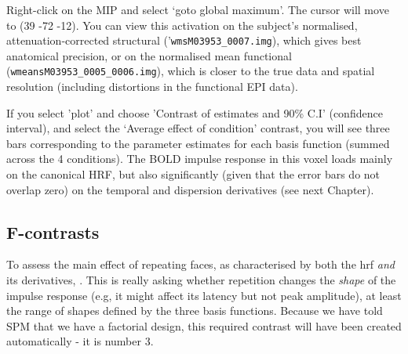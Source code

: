 Right-click on the MIP and select `goto global maximum'. The cursor will move to (39 -72 -12). You can view this activation on the subject's normalised, attenuation-corrected structural ('\verb!wmsM03953_0007.img!), which gives best anatomical precision, or on the normalised mean functional (\verb!wmeansM03953_0005_0006.img!), which is closer to the true data and spatial resolution (including distortions in the functional EPI data). 

If you select 'plot' and choose 'Contrast of estimates and 90\% C.I' (confidence interval), and select the `Average effect of condition' contrast, you will see three bars corresponding to the parameter estimates for each basis function (summed across the 4 conditions). The BOLD impulse response in this voxel loads mainly on the canonical HRF, but also significantly (given that the error bars do not overlap zero) on the temporal and dispersion derivatives (see next Chapter).

\subsection{F-contrasts}

To assess the main effect of repeating faces, as characterised by both the hrf {\em and} its derivatives,    . This is really asking whether repetition changes the {\em shape} of the impulse response (e.g, it might affect its latency but not peak amplitude), at least the range of shapes defined by the three basis functions. Because we have told SPM that we have a factorial design, this required contrast will have been created automatically - it is number 3. 

